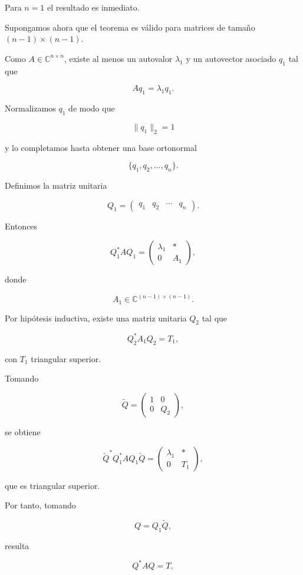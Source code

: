 \documentclass[12pt]{article}
\begin{document}
Para $n=1$ el resultado es inmediato.

Supongamos ahora que el teorema es válido para matrices de tamaño
$(n-1)\times(n-1)$.

Como $A\in\mathbb{C}^{n\times n}$, existe al menos un autovalor
$\lambda_1$ y un autovector asociado $q_1$ tal que

\[
    Aq_1=\lambda_1q_1.
\]

Normalizamos $q_1$ de modo que

\[
    \|q_1\|_2=1
\]

y lo completamos hasta obtener una base ortonormal

\[
    \{q_1,q_2,\ldots,q_n\}.
\]

Definimos la matriz unitaria

\[
    Q_1=
    \begin{pmatrix}
    q_1&q_2&\cdots&q_n
    \end{pmatrix}.
\]

Entonces

\[
    Q_1^*AQ_1
    =
    \begin{pmatrix}
    \lambda_1 & *\\
    0 & A_1
    \end{pmatrix},
\]

donde

\[
    A_1\in\mathbb{C}^{(n-1)\times(n-1)}.
\]

Por hipótesis inductiva, existe una matriz unitaria $Q_2$ tal que

\[
    Q_2^*A_1Q_2=T_1,
\]

con $T_1$ triangular superior.

Tomando

\[
    \widetilde Q
    =
    \begin{pmatrix}
    1&0\\
    0&Q_2
    \end{pmatrix},
\]

se obtiene

\[
    \widetilde Q^*
    Q_1^*AQ_1
    \widetilde Q
    =
    \begin{pmatrix}
    \lambda_1 & *\\
    0&T_1
    \end{pmatrix},
\]

que es triangular superior.

Por tanto, tomando

\[
    Q=Q_1\widetilde Q,
\]

resulta

\[
    Q^*AQ=T,
\]
\end{document}
